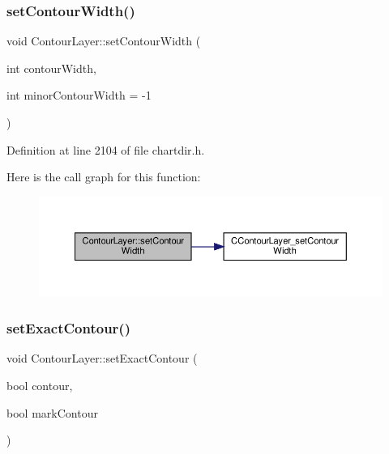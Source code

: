 \subsubsection{\texorpdfstring{set\+Contour\+Width()}{setContourWidth()}}
{\footnotesize\ttfamily void Contour\+Layer\+::set\+Contour\+Width (\begin{DoxyParamCaption}\item[{int}]{contour\+Width,  }\item[{int}]{minor\+Contour\+Width = {\ttfamily -\/1} }\end{DoxyParamCaption})\hspace{0.3cm}{\ttfamily [inline]}}



Definition at line 2104 of file chartdir.\+h.

Here is the call graph for this function\+:
\nopagebreak
\begin{figure}[H]
\begin{center}
\leavevmode
\includegraphics[width=350pt]{class_contour_layer_a66ed82e9a4f37eae9bde3e3e787cfd15_cgraph}
\end{center}
\end{figure}
\mbox{\label{class_contour_layer_ad24edcf3dde8cdf7530b67431177679f}} 
\subsubsection{\texorpdfstring{set\+Exact\+Contour()}{setExactContour()}\hspace{0.1cm}{\footnotesize\ttfamily [1/2]}}
{\footnotesize\ttfamily void Contour\+Layer\+::set\+Exact\+Contour (\begin{DoxyParamCaption}\item[{bool}]{contour,  }\item[{bool}]{mark\+Contour }\end{DoxyParamCaption})\hspace{0.3cm}{\ttfamily [inline]}}



